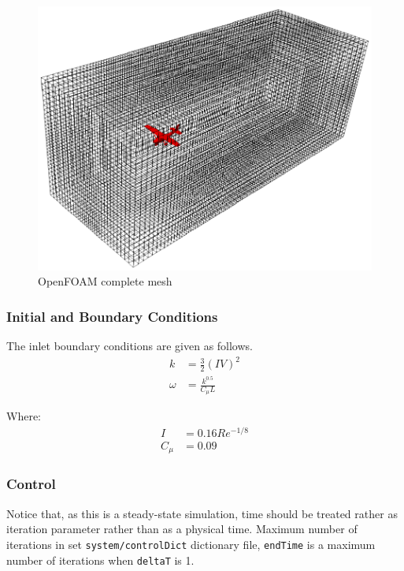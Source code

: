 \begin{figure}[h!]
  \centering
  \includegraphics[width=120mm]{images/openfoam_mesh.eps}
  \caption{OpenFOAM complete mesh}
\end{figure}

\subsubsection{Initial and Boundary Conditions}

The inlet boundary conditions are given as follows. \cite{OpenFOAM-UserGuide-kw-SST}
\begin{align}
  k &= \frac{3}{2} \left( I V \right)^2 \\
  \omega &= \frac{ k^{0.5} }{ C_{\mu} L }
\end{align}

Where: \cite{MoukalledManganiDarwish2016, VersteegMalalasekera2007, Andersson2012, FerzigerPeric2002, FluentUserGuide15}
\begin{align}
  I &= 0.16 Re^{-1/8} \\
  C_{\mu} &= 0.09
\end{align}

\subsubsection{Control}

Notice that, as this is a steady-state simulation, time should be treated rather as iteration parameter rather than as a physical time. Maximum number of iterations in set \texttt{system/controlDict} dictionary file, \texttt{endTime} is a maximum number of iterations when \texttt{deltaT} is 1.

